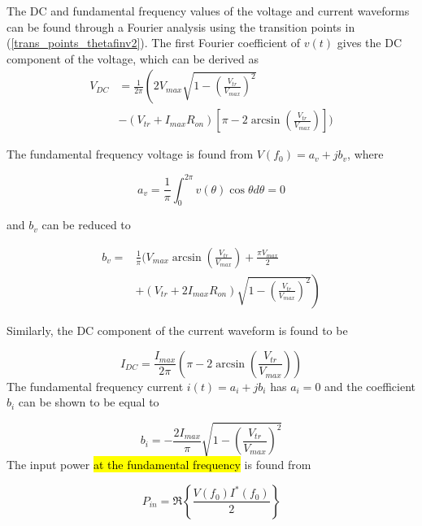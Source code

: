 The DC and fundamental frequency values of the voltage and current waveforms can be found through a Fourier analysis using the transition points in (\ref{trans_points_thetafinv2}). The first Fourier coefficient of $v(t)$ gives the DC component of the voltage, which can be derived as
\begin{equation}\label{finv_dc_comp_5}\begin{split}
    V_{DC} &= \frac{1}{2\pi}\left(2V_{max}\sqrt{1 - \left(\frac{V_{tr}}{V_{max}}\right)^2} \right. \\
    &-(V_{tr} + I_{max}R_{on})\left[\pi - 2\arcsin\left(\frac{V_{tr}}{V_{max}}\right)\right]\Bigg)
\end{split}\end{equation}

The fundamental frequency voltage is found from $V(f_0)=a_v+jb_v$, where
\begin{shaded}
\begin{equation}
a_v=\frac{1}{\pi}\int_0^{2\pi}v(\theta)\cos \theta d\theta = 0
\end{equation}
\end{shaded}
and $b_v$ can be reduced to


\begin{equation}\label{finv_vf0_comp_5}\begin{split}
    b_v =& \frac{1}{\pi}\Bigg(V_{max}\arcsin\left(\frac{V_{tr}}{V_{max}}\right)+ \frac{\pi V_{max}}{2}  \\
    &+ \left.\left(V_{tr} + 2I_{max}R_{on}\right) \sqrt{1 - \left(\frac{V_{tr}}{V_{max}}\right)^2}\right)
\end{split}\end{equation}

Similarly, the DC component of the current waveform is found to be

\begin{equation}\label{finv_idc_comp_3}
    I_{DC} = \frac{I_{max}}{2\pi}\left(\pi - 2\arcsin\left(\frac{V_{tr}}{V_{max}}\right)\right)
\end{equation}
The fundamental frequency current $i(t)=a_i+jb_i$ has $a_i=0$ and the coefficient $b_i$ can be shown to be equal to

\begin{equation}\label{finv_if0_comp_2}
    b_i = -\frac{2I_{max}}{\pi}\sqrt{1 - \left(\frac{V_{tr}}{V_{max}}\right)^2}
\end{equation}
The input power \hl{at the fundamental frequency} is found from


\begin{equation}\label{Pin}
  P_{in} = \Re\left\{\frac{V(f_0)I^{*}(f_0)}{2}\right\}
\end{equation}


